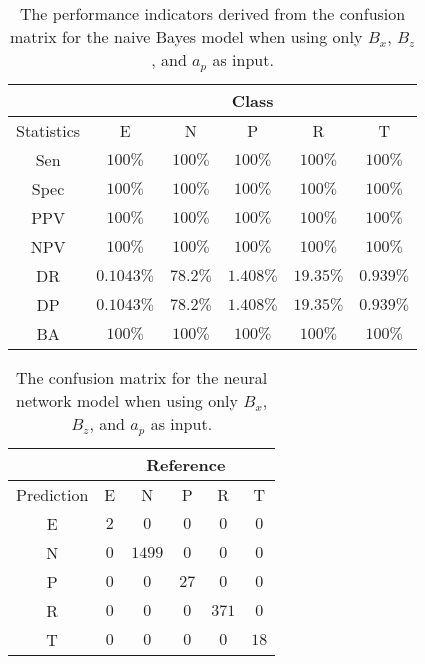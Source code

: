 \begin{table}[!ht]
	\centering
	\begin{tabular}{|c|c|c|c|c|c|}
		\hline
		 & \multicolumn{5}{c|}{Class} \\ \hline
		Statistics & E & N & P & R & T \\ \hline
		Sen & $100\%$ & $100\%$ & $100\%$ & $100\%$ & $100\%$ \\ \hline
		Spec & $100\%$ & $100\%$ & $100\%$ & $100\%$ & $100\%$ \\ \hline
		PPV & $100\%$ & $100\%$ & $100\%$ & $100\%$ & $100\%$ \\ \hline
		NPV & $100\%$ & $100\%$ & $100\%$ & $100\%$ & $100\%$ \\ \hline
		DR & $0.1043\%$ & $78.2\%$ & $1.408\%$ & $19.35\%$ & $0.939\%$ \\ \hline
		DP & $0.1043\%$ & $78.2\%$ & $1.408\%$ & $19.35\%$ & $0.939\%$ \\ \hline
		BA & $100\%$ & $100\%$ & $100\%$ & $100\%$ & $100\%$ \\ \hline
	\end{tabular}
	\caption{The performance indicators derived from the confusion matrix for the naive Bayes model when using only $B_{x}$, $B_{z}$, and $a_{p}$ as input.}
	\label{tab:cs:reverse:xzap:nb}
\end{table}

\begin{table}[!ht]
	\centering
	\begin{tabular}{|c|c|c|c|c|c|}
		\hline
		 & \multicolumn{5}{|c|}{Reference} \\ \hline
		 Prediction & E & N & P & R & T \\ \hline
		 E & $2$ & $0$ & $0$ & $0$ & $0$ \\ \hline
		 N & $0$ & $1499$ & $0$ & $0$ & $0$ \\ \hline
		 P & $0$ & $0$ & $27$ & $0$ & $0$ \\ \hline
		 R & $0$ & $0$ & $0$ & $371$ & $0$ \\ \hline
		 T & $0$ & $0$ & $0$ & $0$ & $18$ \\ \hline
	\end{tabular}
	\caption{The confusion matrix for the neural network model when using only $B_{x}$, $B_{z}$, and $a_{p}$ as input.}
	\label{tab:cm:xzap:nnet}
\end{table}

